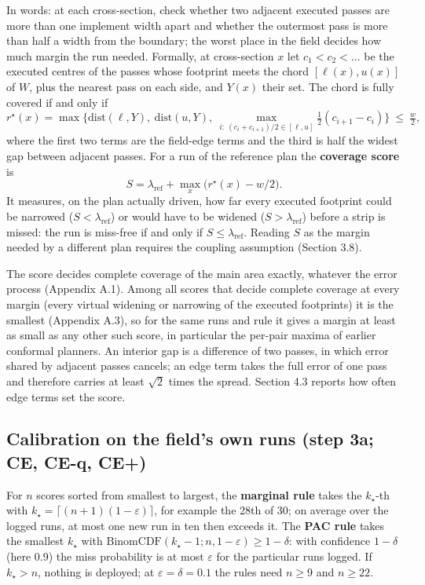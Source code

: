 \documentclass[preprint,12pt,authoryear]{elsarticle}
\begin{document}
In words: at each cross-section, check whether two adjacent executed passes are more than one implement width apart and whether the outermost pass is more than half a width from the boundary; the worst place in the field decides how much margin the run needed. Formally, at cross-section \(x\) let \(c_1<c_2<\dots\) be the executed centres of the passes whose footprint meets the chord \([\ell(x),u(x)]\) of \(W\), plus the nearest pass on each side, and \(Y(x)\) their set. The chord is fully covered if and only if
\[
r^\star(x)=\max\Big\{\mathrm{dist}(\ell,Y),\ \mathrm{dist}(u,Y),\ \max_{i:\ (c_i+c_{i+1})/2\in[\ell,u]}\tfrac12(c_{i+1}-c_i)\Big\}\ \le\ \tfrac w2 ,
\]
where the first two terms are the field-edge terms and the third is half the widest gap between adjacent passes. For a run of the reference plan the \textbf{coverage score} is
\[
S=\lambda_\mathrm{ref}+\max_x\big(r^\star(x)-w/2\big).
\]
It measures, on the plan actually driven, how far every executed footprint could be narrowed (\(S<\lambda_\mathrm{ref}\)) or would have to be widened (\(S>\lambda_\mathrm{ref}\)) before a strip is missed: the run is miss-free if and only if \(S\le\lambda_\mathrm{ref}\). Reading \(S\) as the margin needed by a different plan requires the coupling assumption (Section 3.8).

The score decides complete coverage of the main area exactly, whatever the error process (Appendix A.1). Among all scores that decide complete coverage at every margin (every virtual widening or narrowing of the executed footprints) it is the smallest (Appendix A.3), so for the same runs and rule it gives a margin at least as small as any other such score, in particular the per-pair maxima of earlier conformal planners. An interior gap is a difference of two passes, in which error shared by adjacent passes cancels; an edge term takes the full error of one pass and therefore carries at least \(\sqrt2\) times the spread. Section 4.3 reports how often edge terms set the score.

\subsection{Calibration on the field's own runs (step 3a; CE, CE-q, CE+)}

For \(n\) scores sorted from smallest to largest, the \textbf{marginal rule} takes the \(k_\star\)-th with \(k_\star=\lceil(n+1)(1-\varepsilon)\rceil\), for example the 28th of 30; on average over the logged runs, at most one new run in ten then exceeds it. The \textbf{PAC rule} takes the smallest \(k_\star\) with \(\mathrm{BinomCDF}(k_\star-1;n,1-\varepsilon)\ge1-\delta\): with confidence \(1-\delta\) (here 0.9) the miss probability is at most \(\varepsilon\) for the particular runs logged. If \(k_\star>n\), nothing is deployed; at \(\varepsilon=\delta=0.1\) the rules need \(n\ge9\) and \(n\ge22\).
\end{document}
